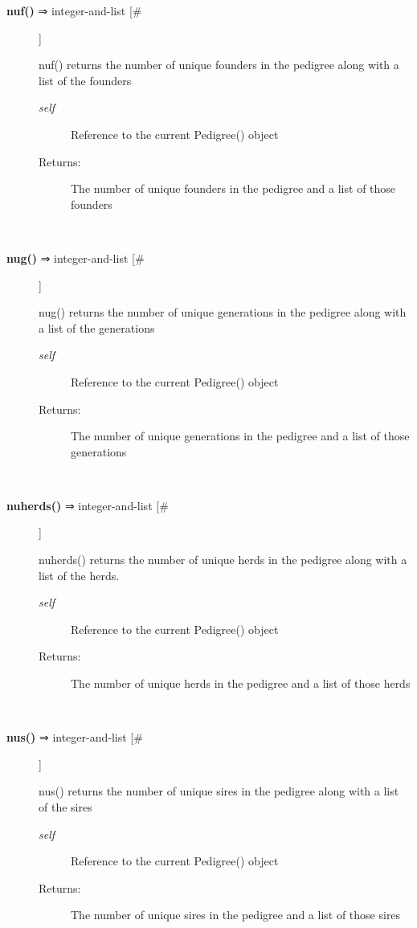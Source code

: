 \documentclass[10pt]{article}
\begin{document}
\begin{description}
\item[\textbf{nuf()}
 ⇒ integer-and-list [\#]]

 nuf() returns the number of unique founders in the pedigree along with a list of the founders
\begin{description}
\item[\emph{self}
] Reference to the current Pedigree() object
\item[Returns:] The number of unique founders in the pedigree and a list of those founders

\end{description}
\\ 

\item[\textbf{nug()}
 ⇒ integer-and-list [\#]]

 nug() returns the number of unique generations in the pedigree along with a list of the generations
\begin{description}
\item[\emph{self}
] Reference to the current Pedigree() object
\item[Returns:] The number of unique generations in the pedigree and a list of those generations

\end{description}
\\ 

\item[\textbf{nuherds()}
 ⇒ integer-and-list [\#]]

 nuherds() returns the number of unique herds in the pedigree along with a list of the herds.
\begin{description}
\item[\emph{self}
] Reference to the current Pedigree() object
\item[Returns:] The number of unique herds in the pedigree and a list of those herds

\end{description}
\\ 

\item[\textbf{nus()}
 ⇒ integer-and-list [\#]]

 nus() returns the number of unique sires in the pedigree along with a list of the sires
\begin{description}
\item[\emph{self}
] Reference to the current Pedigree() object
\item[Returns:] The number of unique sires in the pedigree and a list of those sires


\end{description}
\end{description}
\end{document}
